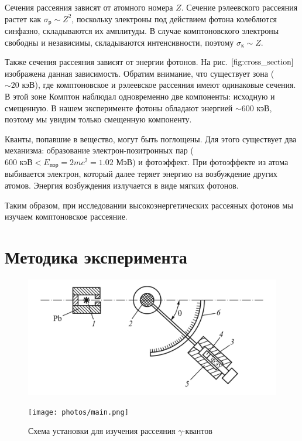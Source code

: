 \documentclass[12pt,a4paper]{article}
\begin{document}
	Сечения рассеяния зависят от атомного номера $Z$. Сечение рэлеевского рассеяния растет как $\sigma_{\text{р}} \sim Z^2$, поскольку электроны под действием фотона колеблются синфазно, складываются их амплитуды. В случае комптоновского электроны свободны и независимы, складываются интенсивности, поэтому $\sigma_{\text{к}} \sim Z$.
	
	Также сечения рассеяния зависят от энергии фотонов. На рис. $\ref{fig:cross_section}$ изображена данная зависимость. Обратим внимание, что существует зона ($\sim 20 \text{ кэВ}$), где комптоновское и рэлеевское рассеяния имеют одинаковые сечения. В этой зоне Комптон наблюдал одновременно две компоненты: исходную и смещенную.
	В нашем эксперименте фотоны обладают энергией $\sim 600 \text{ кэВ}$, поэтому мы увидим только смещенную компоненту.

	Кванты, попавшие в вещество, могут быть поглощены. Для этого существует два механизма: образование электрон-позитронных пар ($600 \text{ кэВ} < E_{\text{пор}} = 2mc^2 = 1.02 \text{ МэВ}$) и фотоэффект. При фотоэффекте из атома выбивается электрон, который далее теряет энергию на возбуждение других атомов. Энергия возбуждения излучается в виде мягких фотонов. 
	
	Таким образом, при исследовании высокоэнергетических рассеяных фотонов мы изучаем комптоновское рассеяние.

	\vspace{20pt}
	\section*{Методика эксперимента}
	
	
	\begin{figure}[H]
		\centering
		\begin{minipage}{0.6\textwidth}
			\centering
			\includegraphics[width=1.0\linewidth]{res/scheme.png}
			\label{fig:scheme}
		\end{minipage}%
		\begin{minipage}{0.4\textwidth}
			\centering
			\texttt{[image: photos/main.png]}			\label{fig:main_photo}
		\end{minipage}
		\caption{Схема установки для изучения рассеяния $\gamma$-квантов}
	\end{figure}
		
\end{document}
